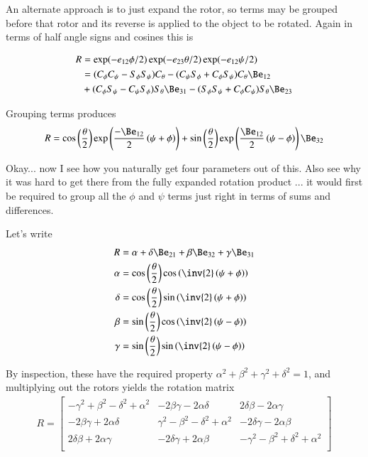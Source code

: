 \documentclass{article}
\begin{document}
An alternate approach is to just expand the rotor, so terms may be grouped before that rotor and its reverse is applied to the object to be
rotated.  Again in terms of half angle signs and cosines this is

\begin{align*}
R &= \exp(-e_{12}\phi/2) \exp(-e_{23}\theta/2) \exp(-e_{12}\psi/2) \\
&=
( C_\phi C_\psi - S_\phi S_\psi ) C_\theta 
- ( C_\psi S_\phi + C_\phi S_\psi ) C_\theta \Be_{12} \\
&+ ( C_\phi S_\psi - C_\psi S_\phi ) S_\theta \Be_{31} 
- ( S_\phi S_\psi + C_\phi C_\psi ) S_\theta \Be_{23}  \\
\end{align*}

Grouping terms produces
\begin{align}\label{eqn:cayleyhalf}
R
=
\cos\left(\frac{\theta}{2}\right)
\exp\left(
\frac{- \Be_{12} }{2}\left(\psi+\phi\right) 
\right)
+ 
\sin\left(\frac{\theta}{2}\right)
\exp\left(
\frac{\Be_{12} }{2}\left(\psi-\phi\right) 
\right)
\Be_{32}
\end{align}

Okay... now I see how you naturally get four parameters out of this.  Also see why it was hard to get there
from the fully expanded rotation product ... it would first be required to group all the $\phi$ and $\psi$ terms just right
in terms of sums and differences.

Let's write
\begin{align*}
R &= \alpha + \delta\Be_{21} + \beta \Be_{32} + \gamma \Be_{31} \\
\alpha &= \cos\left(\frac{\theta}{2}\right) \cos\left( \inv{2}\left(\psi+\phi\right) \right) \\
\delta &= \cos\left(\frac{\theta}{2}\right) \sin\left( \inv{2}\left(\psi+\phi\right) \right) \\
\beta &= \sin\left(\frac{\theta}{2}\right) \cos\left( \inv{2}\left(\psi-\phi\right) \right) \\
\gamma &= \sin\left(\frac{\theta}{2}\right) \sin\left( \inv{2}\left(\psi-\phi\right) \right) \\
\end{align*}

By inspection, these have the required property $\alpha^2 + \beta^2 + \gamma^2 + \delta^2 = 1$, and 
multiplying out the rotors yields the rotation matrix
\begin{align*}
R =
\begin{bmatrix}
 - \gamma^2 + \beta^2 - \delta^2 + \alpha^2 & -2 \beta \gamma -2 \alpha \delta & 2 \delta \beta -2 \alpha \gamma \\
 -2 \beta \gamma + 2 \alpha \delta & \gamma^2 - \beta^2 - \delta^2 + \alpha^2 & -2 \delta \gamma -2 \alpha \beta \\
 2 \delta \beta + 2 \alpha \gamma & -2 \delta \gamma + 2 \alpha \beta & - \gamma^2 - \beta^2 + \delta^2 + \alpha^2 \\
\end{bmatrix}
\end{align*}
\end{document}
